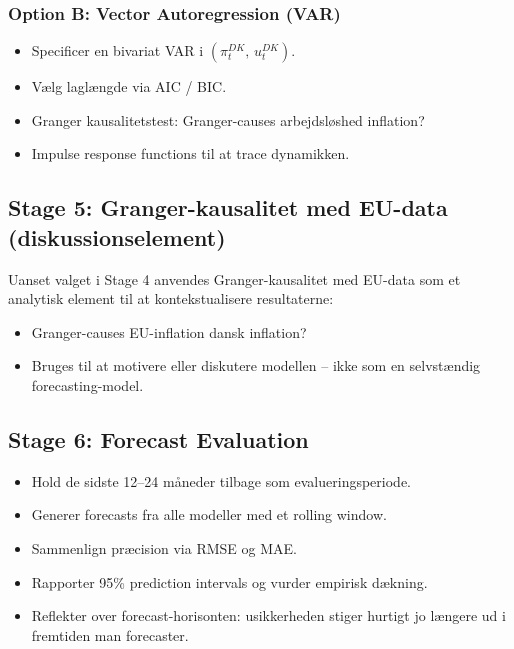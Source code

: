 \subsubsection{Option B: Vector Autoregression (VAR)}

\begin{itemize}[nosep]
    \item Specificer en bivariat VAR i $(\pi_t^{DK},\, u_t^{DK})$.
    \item Vælg laglængde via AIC / BIC.
    \item Granger kausalitetstest: Granger-causes arbejdsløshed inflation?
    \item Impulse response functions til at trace dynamikken.
\end{itemize}

\subsection{Stage 5: Granger-kausalitet med EU-data (diskussionselement)}

Uanset valget i Stage 4 anvendes Granger-kausalitet med EU-data som et
analytisk element til at kontekstualisere resultaterne:

\begin{itemize}[nosep]
    \item Granger-causes EU-inflation dansk inflation?
    \item Bruges til at motivere eller diskutere modellen -- ikke som en
          selvstændig forecasting-model.
\end{itemize}

\subsection{Stage 6: Forecast Evaluation}

\begin{itemize}[nosep]
    \item Hold de sidste 12--24 måneder tilbage som evalueringsperiode.
    \item Generer forecasts fra alle modeller med et rolling window.
    \item Sammenlign præcision via RMSE og MAE.
    \item Rapporter 95\% prediction intervals og vurder empirisk dækning.
    \item Reflekter over forecast-horisonten: usikkerheden stiger hurtigt
          jo længere ud i fremtiden man forecaster.
\end{itemize}

